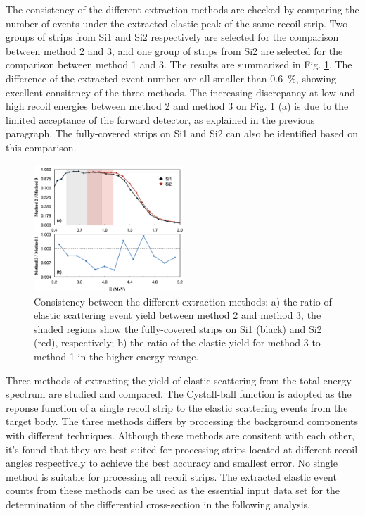 \documentclass[fleqn,twocolumn,a4paper]{ikpar}
\begin{document}
The consistency of the different extraction methods are checked by comparing the
number of events under the extracted elastic peak of the same recoil strip.
Two groups of strips from Si1 and Si2 respectively are selected for the
comparison between method 2 and 3, and one group of strips from Si2 are selected
for the comparison between method 1 and 3.
The results are summarized in Fig. \ref{fig:extraction_consistence}.
The difference of the extracted event number are all smaller than \SI{0.6}{\percent},
showing excellent consitency of the three methods.
The increasing discrepancy at low and high recoil energies between method 2 and
method 3 on Fig. \ref{fig:extraction_consistence} (a) is due to the limited
acceptance of the forward detector, as explained in the previous paragraph.
The fully-covered strips on Si1 and Si2 can also be identified based on this comparison.
\begin{figure}[!htb]
	\includegraphics[width=0.5\textwidth]{./comparison_methods.png}
  \caption{Consistency between the different extraction
    methods: a) the ratio of elastic scattering event yield between method 2 and
    method 3, the shaded regions show the fully-covered strips on Si1
    (black) and Si2 (red), respectively; b) the ratio of the elastic yield for
    method 3 to method 1 in the higher energy reange.}
  \label{fig:extraction_consistence}
\end{figure}

\par
\medskip

Three methods of extracting the yield of elastic scattering from the total
energy spectrum are studied and compared.
The Cystall-ball function is adopted as the reponse function of a single recoil strip to the
elastic scattering events from the target body.
The three methods differs by processing the background components with different techniques.
Although these methods are consitent with each other, it's found that they are best suited for
processing strips located at different recoil angles respectively to achieve the best accuracy
and smallest error.
No single method is suitable for processing all recoil strips.
The extracted elastic event counts from these methods can be used as
the essential input data set for the determination of the differential cross-section in the following analysis.
\end{document}
